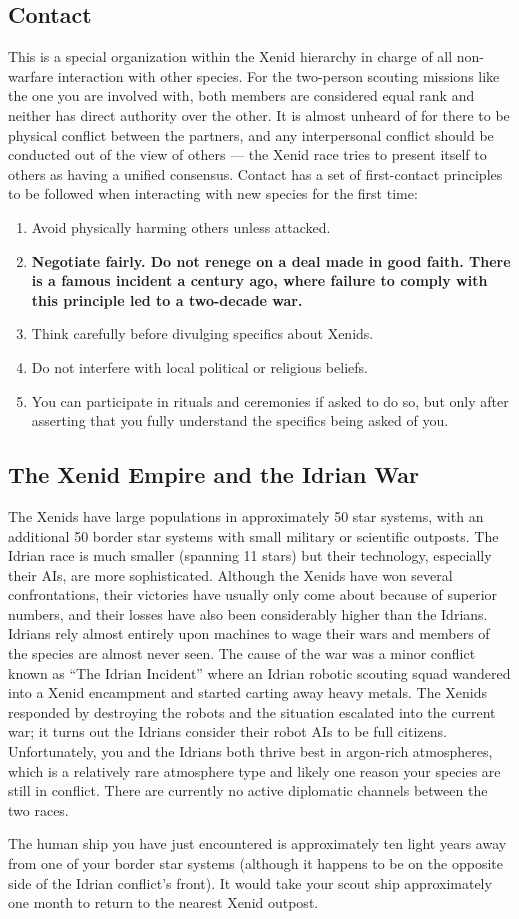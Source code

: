 \documentclass[blue]{guildcamp1}
\begin{document}
\subsection*{Contact}

This is a special organization within the Xenid hierarchy in charge of all non-warfare interaction with other species. For the two-person scouting missions like the one you are involved with, both members are considered equal rank and neither has direct authority over the other. It is almost unheard of for there to be physical conflict between the partners, and any interpersonal conflict should be conducted out of the view of others --- the Xenid race tries to present itself to others as having a unified consensus. Contact has a set of first-contact principles to be followed when interacting with new species for the first time:

\begin{enumerate}
\item Avoid physically harming others unless attacked.
\item \textbf{Negotiate fairly. Do not renege on a deal made in good faith. There is a famous incident a century ago, where failure to comply with this principle led to a two-decade war.}
\item Think carefully before divulging specifics about Xenids.
\item Do not interfere with local political or religious beliefs.
\item You can participate in rituals and ceremonies if asked to do so, but only after asserting that you fully understand the specifics being asked of you.
\end{enumerate}
 
\subsection*{The Xenid Empire and the Idrian War}

The Xenids have large populations in approximately 50 star systems, with an additional 50 border star systems with small military or scientific outposts. The Idrian race is much smaller (spanning 11 stars) but their technology, especially their AIs, are more sophisticated. Although the Xenids have won several confrontations, their victories have usually only come about because of superior numbers, and their losses have also been considerably higher than the Idrians. Idrians rely almost entirely upon machines to wage their wars and members of the species are almost never seen. The cause of the war was a minor conflict known as ``The Idrian Incident'' where an Idrian robotic scouting squad wandered into a Xenid encampment and started carting away heavy metals. The Xenids responded by destroying the robots and the situation escalated into the current war; it turns out the Idrians consider their robot AIs to be full citizens. Unfortunately, you and the Idrians both thrive best in argon-rich atmospheres, which is a relatively rare atmosphere type and likely one reason your species are still in conflict. There are currently no active diplomatic channels between the two races.

The human ship you have just encountered is approximately ten light years away from one of your border star systems (although it happens to be on the opposite side of the Idrian conflict's front). It would take your scout ship approximately one month to return to the nearest Xenid outpost.
\end{document}
